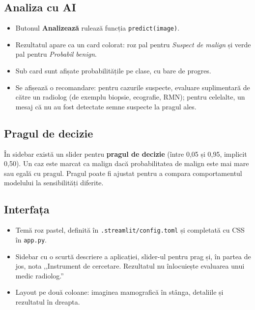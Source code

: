 \documentclass[runningheads,a4paper,11pt]{report}
\begin{document}
\subsection{Analiza cu AI}

\begin{itemize}
	\item Butonul \textbf{Analizează} rulează funcția \texttt{predict(image)}.
	\item Rezultatul apare ca un card colorat: roz pal pentru \emph{Suspect de malign} și verde pal pentru \emph{Probabil benign}.
	\item Sub card sunt afișate probabilitățile pe clase, cu bare de progres.
	\item Se afișează o recomandare: pentru cazurile suspecte, evaluare suplimentară de către un radiolog (de exemplu biopsie, ecografie, RMN); pentru celelalte, un mesaj că nu au fost detectate semne suspecte la pragul ales.
\end{itemize}

\subsection{Pragul de decizie}

În sidebar există un slider pentru \textbf{pragul de decizie} (între 0,05 și 0,95, implicit 0,50). Un caz este marcat ca malign dacă probabilitatea de malign este mai mare sau egală cu pragul. Pragul poate fi ajustat pentru a compara comportamentul modelului la sensibilități diferite.

\subsection{Interfața}

\begin{itemize}
	\item Temă roz pastel, definită în \texttt{.streamlit/config.toml} și completată cu CSS în \texttt{app.py}.
	\item Sidebar cu o scurtă descriere a aplicației, slider-ul pentru prag și, în partea de jos, nota ,,Instrument de cercetare. Rezultatul nu înlocuiește evaluarea unui medic radiolog.''
	\item Layout pe două coloane: imaginea mamografică în stânga, detaliile și rezultatul în dreapta.
\end{itemize}




\end{document}

